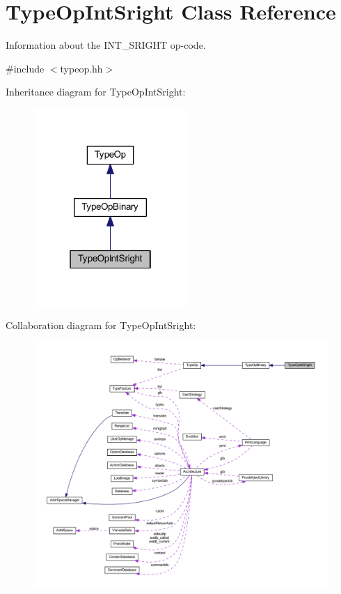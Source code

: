 \hypertarget{class_type_op_int_sright}{}\section{Type\+Op\+Int\+Sright Class Reference}
\label{class_type_op_int_sright}


Information about the I\+N\+T\+\_\+\+S\+R\+I\+G\+HT op-\/code.  




{\ttfamily \#include $<$typeop.\+hh$>$}



Inheritance diagram for Type\+Op\+Int\+Sright\+:
\nopagebreak
\begin{figure}[H]
\begin{center}
\leavevmode
\includegraphics[width=166pt]{class_type_op_int_sright__inherit__graph}
\end{center}
\end{figure}


Collaboration diagram for Type\+Op\+Int\+Sright\+:
\nopagebreak
\begin{figure}[H]
\begin{center}
\leavevmode
\includegraphics[width=350pt]{class_type_op_int_sright__coll__graph}
\end{center}
\end{figure}
